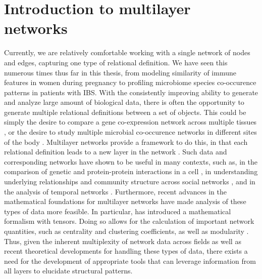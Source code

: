 \section{Introduction to multilayer networks}
Currently, we are relatively comfortable working with a single network of nodes and edges, capturing one type of relational definition. We have seen this numerous times thus far in this thesis, from modeling similarity of immune features in women during pregnancy to profiling microbiome species co-occurence patterns in patients with IBS. With the consistently improving ability to generate and analyze large amount of biological data, there is often the opportunity to generate multiple relational definitions between a set of objects. This could be simply the desire to compare a gene co-expression network across multiple tissues \cite{ohmNet}, or the desire to study multiple microbial co-occurence networks in different sites of the body \cite{microbiome}. Multilayer networks provide a framework to do this, in that each relational definition leads to a new layer in the network \cite{kivelamultilayer,boccaletti2014structure,manlioMathFoundations}.  Such data and corresponding networks have shown to be useful in many contexts, such as, in the comparison of genetic and protein-protein interactions in a cell \cite{genetic}, in understanding underlying relationships and community structure across social networks \cite{socialnetwork}, and in the analysis of temporal networks \cite{muchamultislice}. Furthermore, recent advances in the mathematical foundations for multilayer networks have made analysis of these types of data more feasible. In particular, \cite{manlioMathFoundations} has introduced a mathematical formalism with tensors. Doing so allows for the calculation of important network quantities, such as centrality and clustering coefficients, as well as modularity \cite{muchamultislice}. Thus, given the inherent multiplexity of network data across fields as well as recent theoretical developments for handling these types of data, there exists a need for the development of appropriate tools that can leverage information from all layers to elucidate structural patterns.

